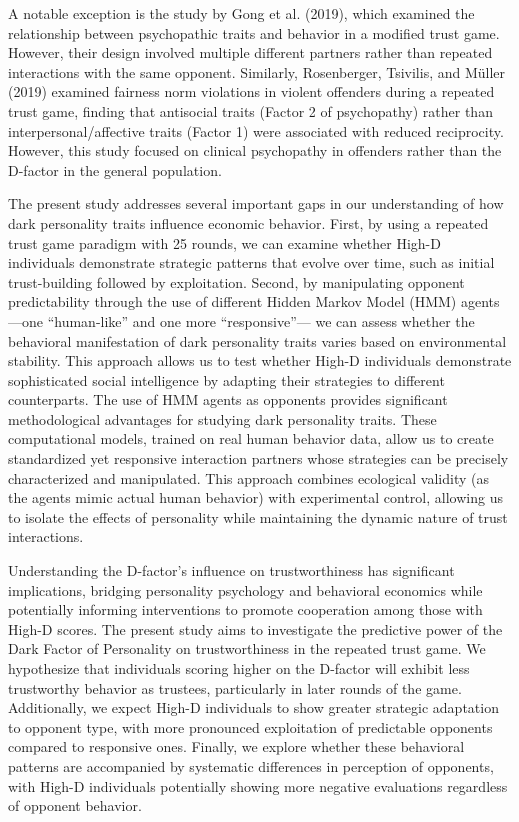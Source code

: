 \documentclass[
]{article}
\begin{document}
A notable exception is the study by Gong et al. (2019), which examined the relationship between psychopathic traits and behavior in a modified trust game. However, their design involved multiple different partners rather than repeated interactions with the same opponent. Similarly, Rosenberger, Tsivilis, and Müller (2019) examined fairness norm violations in violent offenders during a repeated trust game, finding that antisocial traits (Factor 2 of psychopathy) rather than interpersonal/affective traits (Factor 1) were associated with reduced reciprocity. However, this study focused on clinical psychopathy in offenders rather than the D-factor in the general population.

The present study addresses several important gaps in our understanding of how dark personality traits influence economic behavior. First, by using a repeated trust game paradigm with 25 rounds, we can examine whether High-D individuals demonstrate strategic patterns that evolve over time, such as initial trust-building followed by exploitation. Second, by manipulating opponent predictability through the use of different Hidden Markov Model (HMM) agents---one ``human-like'' and one more ``responsive''--- we can assess whether the behavioral manifestation of dark personality traits varies based on environmental stability. This approach allows us to test whether High-D individuals demonstrate sophisticated social intelligence by adapting their strategies to different counterparts.
The use of HMM agents as opponents provides significant methodological advantages for studying dark personality traits. These computational models, trained on real human behavior data, allow us to create standardized yet responsive interaction partners whose strategies can be precisely characterized and manipulated. This approach combines ecological validity (as the agents mimic actual human behavior) with experimental control, allowing us to isolate the effects of personality while maintaining the dynamic nature of trust interactions.

Understanding the D-factor's influence on trustworthiness has significant implications, bridging personality psychology and behavioral economics while potentially informing interventions to promote cooperation among those with High-D scores. The present study aims to investigate the predictive power of the Dark Factor of Personality on trustworthiness in the repeated trust game. We hypothesize that individuals scoring higher on the D-factor will exhibit less trustworthy behavior as trustees, particularly in later rounds of the game. Additionally, we expect High-D individuals to show greater strategic adaptation to opponent type, with more pronounced exploitation of predictable opponents compared to responsive ones. Finally, we explore whether these behavioral patterns are accompanied by systematic differences in perception of opponents, with High-D individuals potentially showing more negative evaluations regardless of opponent behavior.
\end{document}
